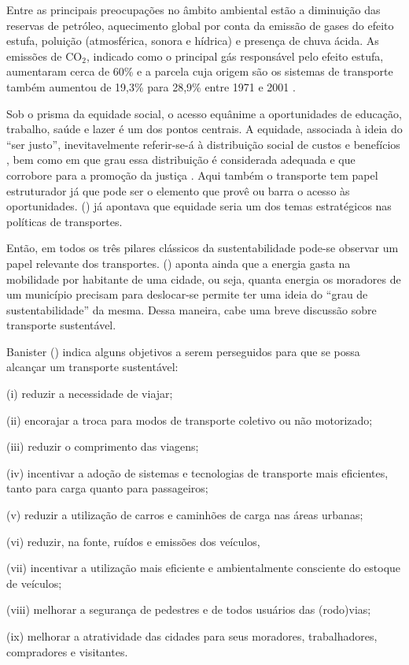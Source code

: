 Entre as principais preocupações no âmbito ambiental estão a diminuição das reservas de petróleo, aquecimento global por conta da emissão de gases do efeito estufa, poluição (atmosférica, sonora e hídrica) e presença de chuva ácida. As emissões de CO$_2$, indicado como o principal gás responsável pelo efeito estufa, aumentaram cerca de 60\% e a parcela cuja origem são os sistemas de transporte também aumentou de 19,3\% para 28,9\% entre 1971 e 2001 \cite{BANISTER2005}.

Sob o prisma da equidade social, o acesso equânime a oportunidades de educação, trabalho, saúde e lazer é um dos pontos centrais. A equidade, associada à ideia do ``ser justo'', inevitavelmente referir-se-á à distribuição social de custos e benefícios , bem como em que grau essa distribuição é considerada adequada e que corrobore para a promoção da justiça \cite{LITMAN2006}. Aqui também o transporte tem papel estruturador já que pode ser o elemento que provê ou barra o acesso às oportunidades.  (\citeyear{SANCHEZ2003}) já apontava que equidade seria um dos temas estratégicos nas políticas de transportes.

Então, em todos os três pilares clássicos da sustentabilidade pode-se observar um papel relevante dos transportes.  (\citeyear{VASCONCELLOS2012}) aponta ainda que a energia gasta na mobilidade por habitante de uma cidade, ou seja, quanta energia os moradores de um município precisam para deslocar-se permite ter uma ideia do ``grau de sustentabilidade'' da mesma. Dessa maneira, cabe uma breve discussão sobre transporte sustentável.

Banister (\citeyear{BANISTER2005,BANISTER2008}) indica alguns objetivos a serem perseguidos para que se possa alcançar um transporte sustentável:
\begin{compactitem}[]
\item (i) reduzir a necessidade de viajar;
\item (ii) encorajar a troca para modos de transporte coletivo ou não motorizado;
\item (iii) reduzir o comprimento das viagens;
\item (iv) incentivar a adoção de sistemas e tecnologias de transporte mais eficientes, tanto para carga quanto para passageiros;
\item (v) reduzir a utilização de carros e caminhões de carga nas áreas urbanas;
\item (vi) reduzir, na fonte, ruídos e emissões dos veículos,
\item (vii) incentivar a utilização mais eficiente e ambientalmente consciente do estoque de veículos;
\item (viii) melhorar a segurança de pedestres e de todos usuários das (rodo)vias;
\item (ix) melhorar a atratividade das cidades para seus moradores, trabalhadores, compradores e visitantes.
\end{compactitem}

